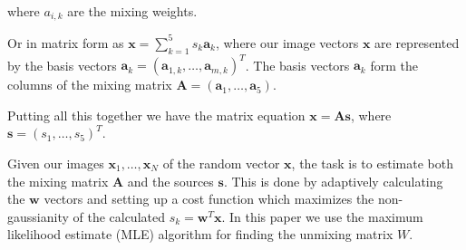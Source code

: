 \documentclass[a4paper,11pt]{article}
\begin{document}
where $a_{i,k}$ are the mixing weights.

Or in matrix form as $\boldsymbol{x}=\sum_{k=1}^{5} s_k \boldsymbol{a}_k$, where our image vectors $\boldsymbol{x}$ are represented by the basis vectors $\boldsymbol{a}_k=(\boldsymbol{a}_{1,k},\ldots,\boldsymbol{a}_{m,k})^T$. The basis vectors $\boldsymbol{a}_k$ form the columns of the mixing matrix $\boldsymbol{A}=(\boldsymbol{a}_1,\ldots,\boldsymbol{a}_5)$.

Putting all this together we have the matrix equation $\boldsymbol{x}=\boldsymbol{A} \boldsymbol{s}$, where $\boldsymbol{s}=(s_1,\ldots,s_5)^T$.

Given our images $\boldsymbol{x}_1,\ldots,\boldsymbol{x}_N$ of the random vector $\boldsymbol{x}$, the task is to estimate both the mixing matrix $\boldsymbol{A}$ and the sources $\boldsymbol{s}$. This is done by adaptively calculating the $\boldsymbol{w}$ vectors and setting up a cost function which maximizes the non-gaussianity of the calculated $s_k = \boldsymbol{w}^T \boldsymbol{x}$. In this paper we use the maximum likelihood estimate (MLE) algorithm for finding the unmixing matrix $W$. 









\vfill














\end{document}
